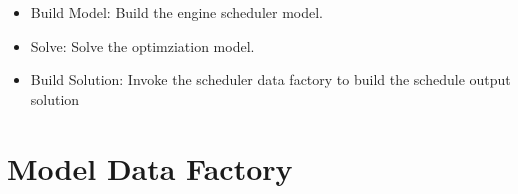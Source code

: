 \documentclass[letterpaper,10pt,english]{sphinxmanual}
\begin{document}
\begin{fulllineitems}
\begin{fulllineitems}
\begin{itemize}
\item {} 
\sphinxAtStartPar
Build Model: Build the engine scheduler model.

\item {} 
\sphinxAtStartPar
Solve: Solve the optimziation model.

\item {} 
\sphinxAtStartPar
Build Solution: Invoke the scheduler data factory to build the schedule output solution

\end{itemize}

\end{fulllineitems}


\end{fulllineitems}



\section{Model Data Factory}
\label{\detokenize{index:module-src.model_data_factory}}\label{\detokenize{index:model-data-factory}}\label{\detokenize{index:module-3}}
\end{document}
